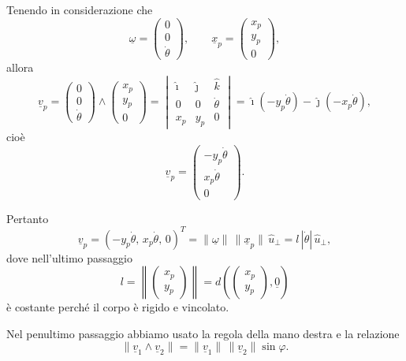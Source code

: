 \begin{examplebreak}{}
Tenendo in considerazione che
\[
\underline{\omega}=
\begin{pmatrix}
0\\
0\\
\dot{\theta}
\end{pmatrix},
\qquad
\underline{x}_p=
\begin{pmatrix}
x_p\\
y_p\\
0
\end{pmatrix},
\]
allora
\[
\underline{v}_p=
\begin{pmatrix}
0\\
0\\
\dot{\theta}
\end{pmatrix}
\wedge
\begin{pmatrix}
x_p\\
y_p\\
0
\end{pmatrix}
=
\begin{vmatrix}
\hat{\imath} & \hat{\jmath} & \hat{k}\\
0 & 0 & \dot{\theta}\\
x_p & y_p & 0
\end{vmatrix}
=
\hat{\imath}(-y_p\dot{\theta})-\hat{\jmath}(-x_p\dot{\theta}),
\]
cioè
\[
\underline{v}_p=
\begin{pmatrix}
-y_p\dot{\theta}\\
x_p\dot{\theta}\\
0
\end{pmatrix}.
\]

Pertanto
\[
\underline{v}_p=(-y_p\dot{\theta},\,x_p\dot{\theta},\,0)^T
=
\|\underline{\omega}\|\,\|\underline{x}_p\|\,\hat{u}_{\perp}
=
l\,|\dot{\theta}|\,\hat{u}_{\perp},
\]
dove nell'ultimo passaggio
\[
l=\left\|
\begin{pmatrix}
x_p\\
y_p
\end{pmatrix}
\right\|
=d\!\left(
\begin{pmatrix}
x_p\\
y_p
\end{pmatrix},
\underline{0}\right)
\]
è costante perché il corpo è rigido e vincolato.

Nel penultimo passaggio abbiamo usato la regola della mano destra e la relazione
\[
\|\underline{v}_1\wedge \underline{v}_2\|
=
\|\underline{v}_1\|\,\|\underline{v}_2\|\sin\varphi.
\]
\end{examplebreak}
